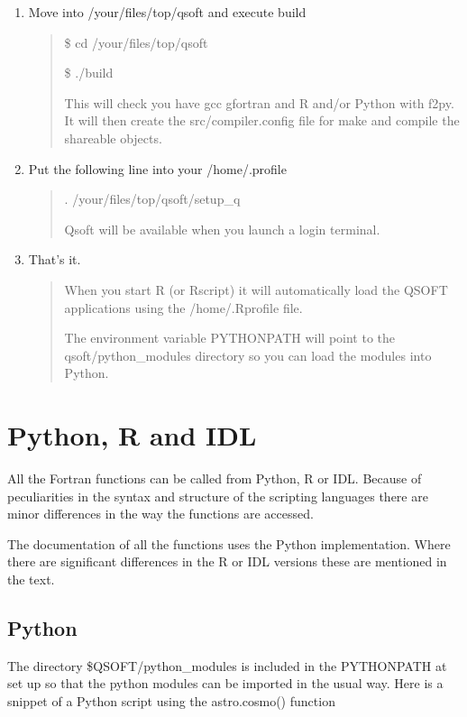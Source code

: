 \documentclass[letterpaper,10pt,english]{sphinxmanual}
\begin{document}
\begin{enumerate}
\def\theenumi{\arabic{enumi}}
\def\labelenumi{\theenumi .}
\makeatletter\def\p@enumii{\p@enumi \theenumi .}\makeatother
\setcounter{enumi}{2}
\item {} 
Move into /your/files/top/qsoft and execute build
\begin{quote}

\$ cd /your/files/top/qsoft

\$ ./build

This will check you have gcc gfortran and R and/or Python with f2py.  It will then create the src/compiler.config file for make and compile the shareable objects.
\end{quote}

\item {} 
Put the following line into your /home/.profile
\begin{quote}

. /your/files/top/qsoft/setup\_q

Qsoft will be available when you launch a login terminal.
\end{quote}

\item {} 
That’s it.
\begin{quote}

When you start R (or Rscript) it will automatically load the QSOFT applications
using the /home/.Rprofile file.

The environment variable PYTHONPATH will point to the qsoft/python\_modules
directory so you can load the modules into Python.
\end{quote}

\end{enumerate}


\chapter{Python, R and IDL}
\label{\detokenize{using_py_R_IDL:python-r-and-idl}}\label{\detokenize{using_py_R_IDL::doc}}
All the Fortran functions can be called from Python, R or IDL.
Because of peculiarities in the syntax and structure of the scripting languages
there are minor differences in the way the functions are accessed.

The documentation of all the functions uses the Python implementation. Where
there are significant differences in the R or IDL versions these are
mentioned in the text.


\section{Python}
\label{\detokenize{using_py_R_IDL:python}}
The directory \$QSOFT/python\_modules is included in the PYTHONPATH at set up so
that the python  modules can be imported in the usual way. Here is a
snippet of a Python script using the astro.cosmo() function
\end{document}
